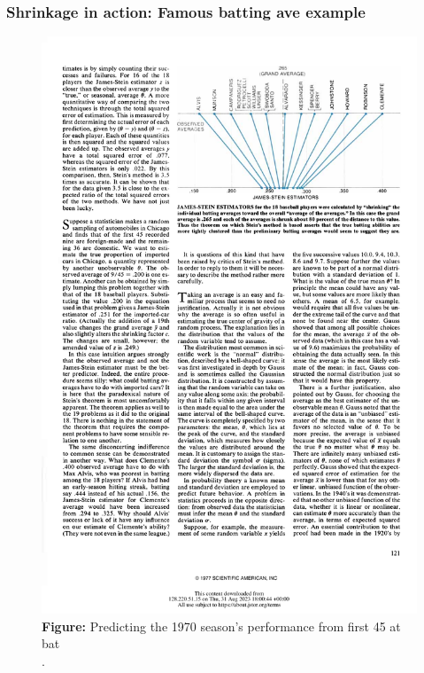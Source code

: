 \documentclass[18pt]{beamer}
\begin{document}
\begin{frame}
\frametitle{Shrinkage in action: Famous batting ave example}
\begin{figure}
\centering
\includegraphics[width=.75\linewidth]{Figure/batting_ave_example_scientific_american}
\caption*{\textcolor{themecolor}{\textbf{Figure:}}
	Predicting the 1970 season's performance from first 45 at bat\\ \hfill \citep{efron1977stein_sci_american}.%
}%
\end{figure}
\end{frame}
\end{document}
